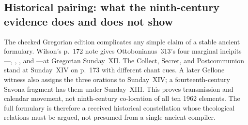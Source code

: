 \subsection*{Historical pairing: what the ninth-century evidence does and does not show}

The checked Gregorian edition complicates any simple claim of a stable ancient
formulary. Wilson's p.~172 note gives Ottobonianus~313's four marginal
incipits---, , , and
---at Gregorian Sunday~XII. The Collect, Secret, and
Postcommunion stand at Sunday~XIV on p.~173 with different chant cues. A later Gellone
witness also assigns the three orations to Sunday~XIV; a fourteenth-century
Savona fragment has them under Sunday~XIII. This proves transmission and
calendar movement, not ninth-century co-location of all ten 1962 elements.
The full formulary is therefore a received historical constellation whose
theological relations must be argued, not presumed from a single ancient
compiler.
